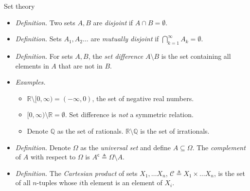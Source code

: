 \documentclass{beamer}
\begin{document}
\begin{frame}{Set theory}
    \begin{itemize}
        \item
        \textit{Definition.} Two sets $ A, B $ are \textit{disjoint} if
        $ A \cap B = \emptyset $.

        \item
        \textit{Definition.} Sets $ A_1, A_2 \ldots $ are
        \textit{mutually disjoint} if $ \bigcap_{k = 1}^\infty A_k =
        \emptyset $.

        \item
        \textit{Definition.} For sets $ A, B $, the \textit{set difference}
        $ A \setminus B $ is the set containing all elements in $ A $ that are
        not in $ B $.

        \item
        \textit{Examples.}
        \begin{itemize}
            \item
            $ \mathbb{R} \setminus [0, \infty) = (-\infty, 0) $, the set of
            negative real numbers. 

            \item
            $ [0, \infty) \setminus \mathbb{R} = \emptyset $. Set difference
            is \textit{not} a symmetric relation.

            \item
            Denote $ \mathbb{Q} $ as the set of rationals.
            $ \mathbb{R} \setminus \mathbb{Q} $ is the set of irrationals.
        \end{itemize}

        \item
        \textit{Definition.} Denote $ \Omega $ as the \textit{universal set}
        and define $ A \subseteq \Omega $. The \textit{complement} of $ A $
        with respect to $ \Omega $ is $ A^\mathsf{c} \triangleq \Omega
        \setminus A $.

        \item
        \textit{Definition.} The \textit{Cartesian product} of sets
        $ X_1, \ldots X_n $, $ \mathcal{C} \triangleq
        X_1 \times \ldots X_n $, is the set of all $ n $-tuples whose
        $ i $th element is an element of $ X_i $.
    \end{itemize}
\end{frame}
\end{document}
